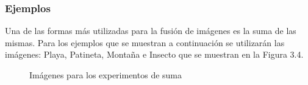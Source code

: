 \subsubsection{Ejemplos}

Una de las formas m\'as utilizadas para la fusi\'on de im\'agenes es la suma de las mismas. Para los ejemplos que se muestran a continuaci\'on se utilizar\'an las im\'agenes: Playa, Patineta, Monta\~na e Insecto que se muestran en la Figura 3.4.

\begin{figure}
	\begin{center}
		\caption{Im\'agenes para los experimentos de suma}
	\end{center}
\end{figure}

